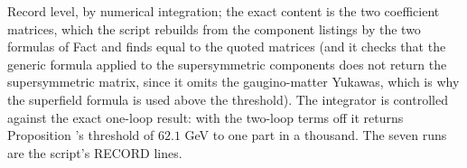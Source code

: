 Record level, by numerical integration; the exact content is the two coefficient matrices, which the script rebuilds from the component listings by the two formulas of Fact  and finds equal to the quoted matrices (and it checks that the generic formula applied to the supersymmetric components does not return the supersymmetric matrix, since it omits the gaugino-matter Yukawas, which is why the superfield formula is used above the threshold). The integrator is controlled against the exact one-loop result: with the two-loop terms off it returns Proposition 's threshold of $62.1$ GeV to one part in a thousand. The seven runs are the script's RECORD lines.
